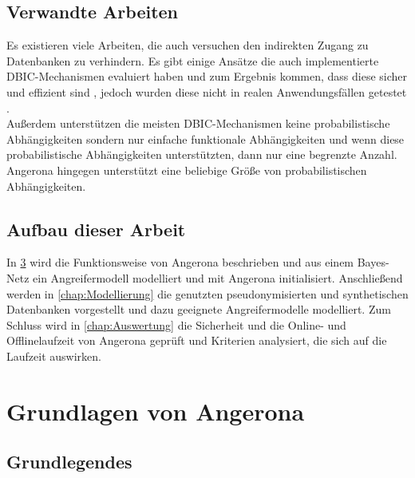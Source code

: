 \documentclass[german,version-2020-11]{uzl-thesis}
\begin{document}
\section{Verwandte Arbeiten}
Es existieren viele Arbeiten, die auch versuchen den indirekten Zugang zu Datenbanken zu verhindern. Es gibt einige Ansätze die auch implementierte DBIC-Mechanismen evaluiert haben und zum Ergebnis kommen, dass diese sicher und effizient sind , jedoch wurden diese nicht in realen Anwendungsfällen getestet \cite{24}. \\ 
Außerdem unterstützen die meisten DBIC-Mechanismen keine probabilistische Abhängigkeiten sondern nur einfache funktionale Abhängigkeiten und wenn diese probabilistische Abhängigkeiten unterstützten, dann nur eine begrenzte Anzahl. Angerona hingegen unterstützt eine beliebige Größe von probabilistischen Abhängigkeiten.

\section{Aufbau dieser Arbeit}
In \cref{chap:Grundlagen} wird die Funktionsweise von Angerona beschrieben und aus einem Bayes-Netz ein Angreifermodell modelliert und mit Angerona initialisiert. Anschließend werden in  \cref{chap:Modellierung} die genutzten pseudonymisierten und synthetischen Datenbanken vorgestellt und dazu geeignete Angreifermodelle modelliert. Zum Schluss wird in \cref{chap:Auswertung} die Sicherheit und die Online- und Offlinelaufzeit von Angerona geprüft und Kriterien analysiert, die sich auf die Laufzeit auswirken.

\chapter{Grundlagen von Angerona}\label{chap:Grundlagen}
\section{Grundlegendes}
\end{document}
